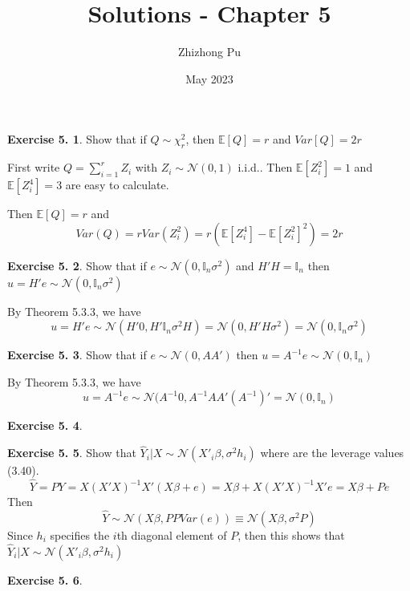 \documentclass[12pt,letterpaper,reqno]{amsart}
\newcommand{\E}{\mathbb E}
\newcommand{\I}{\mathbb I}
\theoremstyle{plain}
\theoremstyle{definition}
\theoremstyle{definition}
\newtheorem{Exercise}{Exercise 5.}
\numberwithin{equation}{section}
\begin{document}
\author{Zhizhong Pu}
\title{Solutions - Chapter 5}
\date{May 2023}
\maketitle

\thispagestyle{empty}

\begin{Exercise} Show that if $Q\sim \chi^2_r$, then $\E[Q]=r$ and $Var[Q]=2r$ 

    First write $Q=\sum_{i=1}^rZ_i$ with $Z_i\sim\mathcal{N}(0,1)$ i.i.d.. Then $\E[Z_i^2]=1$ and $\E[Z_i^4]=3$ are easy to calculate.
    
    Then $\E[Q]=r$ and
    \[
    Var(Q) = r Var(Z_i^2) = r (\E[Z_i^4] - \E[Z_i^2]^2) = 2r
    \]
\end{Exercise}

\begin{Exercise} Show that if $e \sim \mathcal{N}(0,\I_n\sigma^2)$ and $H'H=\I_n$ then $u=H'e \sim \mathcal{N}(0,\I_n\sigma^2)$

By Theorem 5.3.3, we have 
\[
u = H'e \sim \mathcal{N}(H'0,H'\I_n\sigma^2H) = \mathcal{N}(0,H'H\sigma^2) = \mathcal{N}(0,\I_n\sigma^2)
\]
\end{Exercise}

\begin{Exercise} Show that if $e \sim \mathcal{N}(0,AA')$ then $u=A^{-1}e \sim \mathcal{N}(0,\I_n)$

By Theorem 5.3.3, we have 
\[
u = A^{-1} e \sim \mathcal{N}(A^{-1} 0,A^{-1}AA' (A^{-1})' = \mathcal{N}(0,\I_n)
\]
\end{Exercise}

\begin{Exercise}\end{Exercise}

\begin{Exercise} Show that $\hat{Y}_i|X \sim \mathcal{N}(X'_i\beta,\sigma^2h_i)$ where are the leverage values (3.40).
    \[
    \hat{Y} = PY = X(X'X)^{-1}X'(X\beta+e) = X\beta + X(X'X)^{-1}X'e =  X\beta + Pe
    \]
    Then
    \[
    \hat{Y} \sim \mathcal{N}(X\beta, PPVar(e)) \equiv \mathcal{N}(X\beta, \sigma^2P)
    \]
    Since $h_i$ specifies the $i$th diagonal element of $P$, then this shows that $\hat{Y}_i|X \sim \mathcal{N}(X'_i\beta,\sigma^2h_i)$

\end{Exercise}

\begin{Exercise} \end{Exercise}
\end{document}
